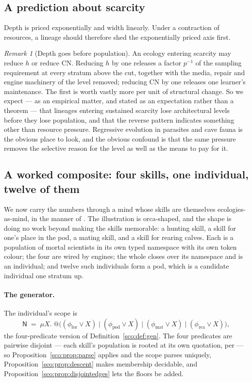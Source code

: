 \documentclass[11pt]{article}
\makeatletter
\theoremstyle{plain}
\theoremstyle{definition}
\theoremstyle{remark}
\newtheorem{remark}[theorem]{Remark}
\newcommand{\Nsp}{\mathsf{N}}
\newcommand{\quo}[1]{@#1}
\newcommand{\CN}{\mathrm{CN}}
\makeatother
\begin{document}
\subsection{A prediction about scarcity}\label{sco:S7.4}

Depth is priced exponentially and width linearly. Under a contraction of
resources, a lineage should therefore shed the exponentially priced axis
first.

\begin{remark}[Depth goes before population]\label{sco:rem:shed}
An ecology entering scarcity may reduce $h$ or reduce $\CN$. Reducing $h$
by one releases a factor $p^{-1}$ of the sampling requirement at every
stratum above the cut, together with the media, repair and engine
machinery of the level removed; reducing $\CN$ by one releases one
learner's maintenance. The first is worth vastly more per unit of
structural change. So we expect --- as an empirical matter, and stated as
an expectation rather than a theorem --- that lineages entering sustained
scarcity lose architectural levels before they lose population, and that
the reverse pattern indicates something other than resource pressure.
Regressive evolution in parasites and cave fauna is the obvious place to
look, and the obvious confound is that the same pressure removes the
selective reason for the level as well as the means to pay for it.
\end{remark}

\subsection{A worked composite: four skills, one individual, twelve of them}
\label{sco:S7.5}

We now carry the numbers through a mind whose skills are themselves
ecologies-as-mind, in the manner of \cite[\S12]{compose}. The illustration
is orca-shaped, and the shape is doing no work beyond making the skills
memorable: a hunting skill, a skill for one's place in the pod, a mating
skill, and a skill for rearing calves. Each is a population of mortal
scientists in its own typed namespace with its own token colour; the four
are wired by engines; the whole closes over its namespace and is an
individual; and twelve such individuals form a pod, which is a candidate
individual one stratum up.

\paragraph{The generator.}
The individual's scope is
\[
  \Nsp \;=\; \mu X.\;
  \quo{\bigl( (\phi_{\mathrm{for}} \lor X) \mid
              (\phi_{\mathrm{pod}} \lor X) \mid
              (\phi_{\mathrm{mat}} \lor X) \mid
              (\phi_{\mathrm{rea}} \lor X) \bigr)},
\]
the four-predicate version of Definition~\ref{sco:def:gen}. The four
predicates are pairwise disjoint --- each skill's population is rooted at
its own quotation, per \cite[\S9]{compose} --- so
Proposition~\ref{sco:prop:parse} applies and the scope parses uniquely,
Proposition~\ref{sco:prop:descent} makes membership decidable, and
Proposition~\ref{sco:prop:disjointedges} lets the floors be added.
\end{document}
